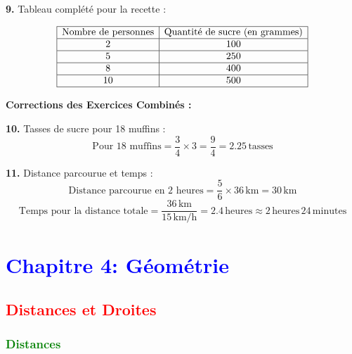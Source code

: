 \documentclass{article}
\begin{document}
\begin{tcolorbox}[colback=green!10!white, colframe=green!75!black, title=\textcolor{white}{\textbf{Corrections}}, sharp corners=south, boxrule=0.8mm]
    \vspace{10pt}
    
    \textbf{9.} Tableau complété pour la recette :
    
    \[
    \begin{array}{|c|c|}
    \hline
    \text{Nombre de personnes} & \text{Quantité de sucre (en grammes)} \\
    \hline
    2 & 100 \\
    \hline
    5 & 250 \\
    \hline
    8 & 400 \\
    \hline
    10 & 500 \\
    \hline
    \end{array}
    \]
    
    \vspace{20pt}
    
    \textbf{Corrections des Exercices Combinés :}
    
    \vspace{5pt}
    
    \textbf{10.} Tasses de sucre pour 18 muffins :
    \[
    \text{Pour 18 muffins} = \frac{3}{4} \times 3 = \frac{9}{4} = 2.25 \, \text{tasses}
    \]
    
    \vspace{10pt}
    
    \textbf{11.} Distance parcourue et temps :
    \[
    \text{Distance parcourue en 2 heures} = \frac{5}{6} \times 36 \, \text{km} = 30 \, \text{km}
    \]
    \[
    \text{Temps pour la distance totale} = \frac{36 \, \text{km}}{15 \, \text{km/h}} = 2.4 \, \text{heures} \approx 2 \, \text{heures} \, 24 \, \text{minutes}
    \]
    
\end{tcolorbox}

\section{\textcolor{blue}{Chapitre 4: Géométrie}}

\subsection{\textcolor{red}{Distances et Droites}}

\subsubsection{\textcolor{green}{Distances}}
\end{document}
